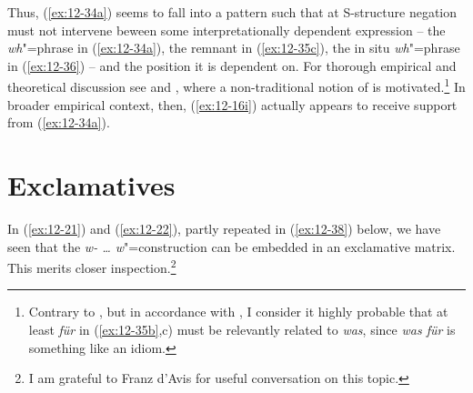 \documentclass[output=paper]{langsci/langscibook}
\begin{document}
Thus, (\ref{ex:12-34a}) seems to fall into a pattern such that at S-structure
negation must not intervene beween some interpretationally dependent
expression -- the \emph{wh}"=phrase in (\ref{ex:12-34a}), the remnant in (\ref{ex:12-35c}),
the in situ \emph{wh}"=phrase in (\ref{ex:12-36}) -- and the position it is
dependent on. For thorough empirical and theoretical discussion see
\citet{Beck1993} and \citet{Beck1996}, where a non-traditional notion of  is motivated.\footnote{%
Contrary to \citet[48]{Beck1996}, but in
  accordance with \citet[11]{Beck1993}, I consider it highly probable that
  at least \textit{für} in (\ref{ex:12-35b},c) must be relevantly related to \textit{was}, since \textit{was für} is something like an idiom.%
}
In broader empirical context, then, (\ref{ex:12-16i}) actually appears to receive
support from (\ref{ex:12-34a}).

\section{Exclamatives}
\label{sec:12-9}

In (\ref{ex:12-21}) and (\ref{ex:12-22}), partly repeated in (\ref{ex:12-38}) below, we have seen that the \textit{w- \ldots{}  w}"=construction can be embedded in an exclamative matrix. This
merits closer inspection.\footnote{%
	I am grateful to Franz d'Avis for useful conversation on this topic.%
}
\end{document}
